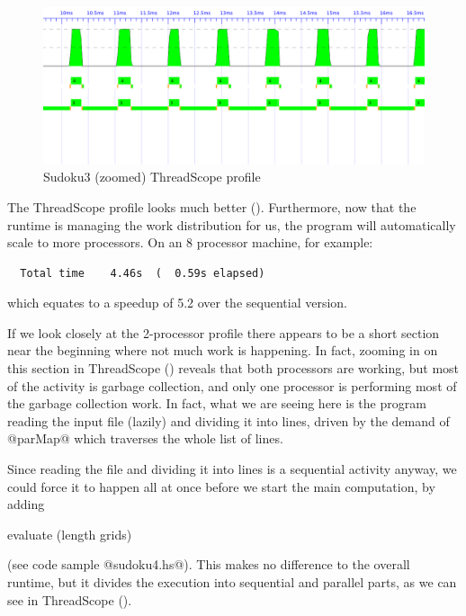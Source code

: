 \begin{figure}
\begin{center}
\includegraphics[scale=0.4]{sudoku3-zoom.png}
\end{center}
\caption{Sudoku3 (zoomed) ThreadScope profile}
\label{fig:sudoku3-zoom-threadscope}
\end{figure}

The ThreadScope profile looks much better
().  Furthermore, now that the runtime is
managing the work distribution for us, the program will automatically
scale to more processors.  On an 8 processor machine, for example:

{\small \begin{verbatim}
  Total time    4.46s  (  0.59s elapsed)
\end{verbatim}}

\noindent which equates to a speedup of 5.2 over the sequential
version.

If we look closely at the 2-processor profile there appears to be a
short section near the beginning where not much work is happening.  In
fact, zooming in on this section in ThreadScope
() reveals that both processors
are working, but most of the activity is garbage collection, and only
one processor is performing most of the garbage collection work.  In
fact, what we are seeing here is the program reading the input file
(lazily) and dividing it into lines, driven by the demand of @parMap@
which traverses the whole list of lines.

Since reading the file and dividing it into lines is a sequential
activity anyway, we could force it to happen all at once before we
start the main computation, by adding

\begin{haskell}
    evaluate (length grids)
\end{haskell}

\noindent (see code sample @sudoku4.hs@).  This makes no difference to
the overall runtime, but it divides the execution into sequential and
parallel parts, as we can see in ThreadScope
().

